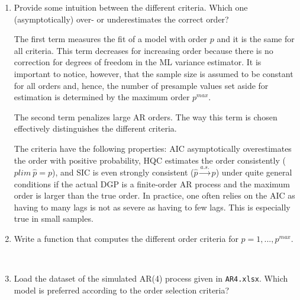 \documentclass[a4paper]{scrartcl}
\begin{document}
\begin{enumerate}
	\item Provide some intuition between the different criteria. Which one (asymptotically) over- or underestimates the correct order?
	\begin{solution}
	The first term measures the fit of a model with order $p$ and it is the same for all criteria. This term decreases for increasing order because there is no correction for degrees of freedom in the ML variance estimator. It is important to notice, however, that the sample size is assumed to be constant for all orders and, hence, the number of presample values set aside for estimation is determined by the maximum order $p^{max}$.
	
	The second term penalizes large AR orders. The way this term is chosen effectively distinguishes the different criteria.
	
	The criteria have the following properties: AIC asymptotically overestimates the order with positive probability, HQC estimates the order consistently ($plim~ \hat{p}= p$), and SIC is even strongly consistent ($\hat{p} \overset{a.s.}{\rightarrow} p$) under quite general conditions if the actual DGP is a finite-order AR process and the maximum order is larger than the true order. In practice, one often relies on the AIC as having to many lags is not as severe as having to few lags. This is especially true in small samples.
	
	\end{solution}
	\item Write a function that computes the different order criteria for $p = 1,...,p^{max}$. 
	\begin{solution}~
		
	\end{solution}
	
	\item Load the dataset of the simulated AR(4) process given in \texttt{AR4.xlsx}. Which model is preferred according to the order selection criteria?
	\begin{solution}~
		
\newpage %
	\end{solution}
\end{enumerate}
\newpage
\end{document}
